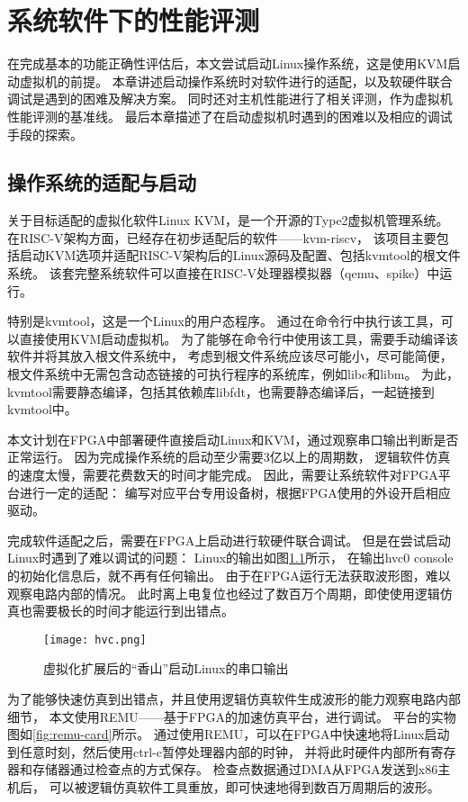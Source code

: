 \chapter{系统软件下的性能评测}

在完成基本的功能正确性评估后，本文尝试启动Linux操作系统，这是使用KVM启动虚拟机的前提。
本章讲述启动操作系统时对软件进行的适配，以及软硬件联合调试是遇到的困难及解决方案。
同时还对主机性能进行了相关评测，作为虚拟机性能评测的基准线。
最后本章描述了在启动虚拟机时遇到的困难以及相应的调试手段的探索。

\section{操作系统的适配与启动}
关于目标适配的虚拟化软件Linux KVM，是一个开源的Type2虚拟机管理系统。
在RISC-V架构方面，已经存在初步适配后的软件——kvm-riscv\cite{github:riscv-kvm}，
该项目主要包括启动KVM选项并适配RISC-V架构后的Linux源码及配置、包括kvmtool的根文件系统。
该套完整系统软件可以直接在RISC-V处理器模拟器（qemu、spike）中运行。

特别是kvmtool，这是一个Linux的用户态程序。
通过在命令行中执行该工具，可以直接使用KVM启动虚拟机。
为了能够在命令行中使用该工具，需要手动编译该软件并将其放入根文件系统中，
考虑到根文件系统应该尽可能小，尽可能简便，
根文件系统中无需包含动态链接的可执行程序的系统库，例如libc和libm。
为此，kvmtool需要静态编译，包括其依赖库libfdt，也需要静态编译后，一起链接到kvmtool中。

本文计划在FPGA中部署硬件直接启动Linux和KVM，通过观察串口输出判断是否正常运行。
因为完成操作系统的启动至少需要3亿以上的周期数，
逻辑软件仿真的速度太慢，需要花费数天的时间才能完成。
因此，需要让系统软件对FPGA平台进行一定的适配：
编写对应平台专用设备树，根据FPGA使用的外设开启相应驱动。

完成软件适配之后，需要在FPGA上启动进行软硬件联合调试。
但是在尝试启动Linux时遇到了难以调试的问题：
Linux的输出如图\ref{fig:console-block}所示，
在输出hvc0 console的初始化信息后，就不再有任何输出。
由于在FPGA运行无法获取波形图，难以观察电路内部的情况。
此时离上电复位也经过了数百万个周期，即使使用逻辑仿真也需要极长的时间才能运行到出错点。

\begin{figure}[htbp]
    \centering
\texttt{[image: hvc.png]}
    \caption{虚拟化扩展后的“香山”启动Linux的串口输出}
    \label{fig:console-block}
\end{figure}

为了能够快速仿真到出错点，并且使用逻辑仿真软件生成波形的能力观察电路内部细节，
本文使用REMU\cite{iccd2023remu}——基于FPGA的加速仿真平台，进行调试。
平台的实物图如\ref{fig:remu-card}所示。
通过使用REMU，可以在FPGA中快速地将Linux启动到任意时刻，然后使用ctrl-c暂停处理器内部的时钟，
并将此时硬件内部所有寄存器和存储器通过检查点的方式保存。
检查点数据通过DMA从FPGA发送到x86主机后，
可以被逻辑仿真软件工具重放，即可快速地得到数百万周期后的波形。

